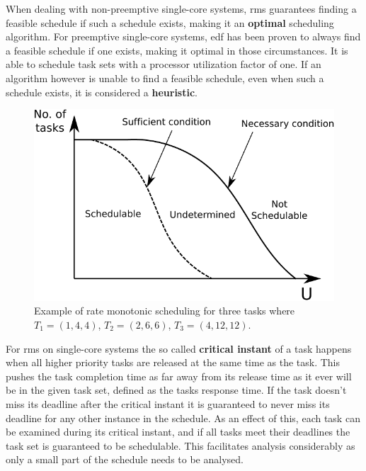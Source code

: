 \documentclass{kththesis}
\begin{document}
When dealing with non-preemptive single-core systems, \acrshort{rms} guarantees finding a feasible
schedule if such a schedule exists, making it an \textbf{optimal} scheduling algorithm. For
preemptive single-core systems, \acrshort{edf} has been proven to always find a feasible schedule if
one exists, making it optimal in those circumstances. It is able to schedule task sets with a
processor utilization factor of one. If an algorithm however is unable to find a feasible schedule, even
when such a schedule exists, it is considered a \textbf{heuristic}.

\begin{figure}

    \centering

    \includegraphics[width=0.8\linewidth]{images/sufficient_necessary_schedulability.pdf}

    \caption{Example of rate monotonic scheduling for three tasks where $T_1=(1, 4, 4)$, $T_2=(2, 6,
    6)$, $T_3=(4, 12, 12)$.}

    \label{fig:sufficient_necessary_schedulability}

\end{figure}

For \acrshort{rms} on single-core systems the so called \textbf{critical instant} of a task happens
when all higher priority tasks are released at the same time as the task. This pushes the task
completion time as far away from its release time as it ever will be in the given task set, defined
as the tasks response time. If the task doesn't miss its deadline after the critical instant it is
guaranteed to never miss its deadline for any other instance in the schedule. As an effect of this,
each task can be examined during its critical instant, and if all tasks meet their deadlines the
task set is guaranteed to be schedulable. This facilitates analysis considerably as only a small
part of the schedule needs to be analysed.
\end{document}
